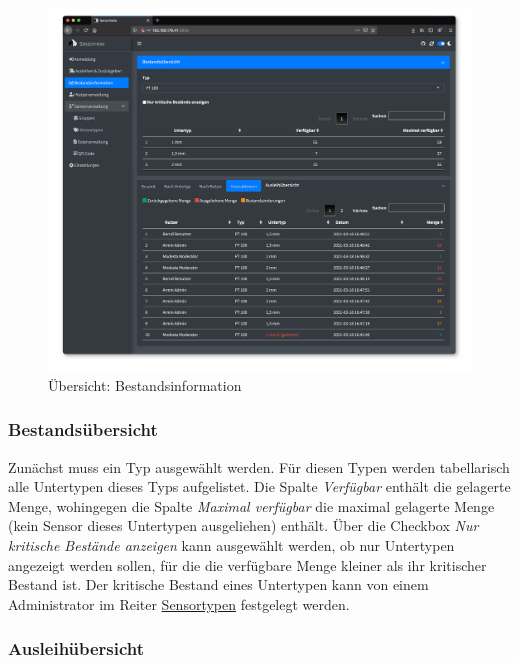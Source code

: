 \documentclass[
]{article}
\begin{document}
\begin{figure}
\centering
\includegraphics{./img/reporting_overview.png}
\caption{\label{fig:reporting-overview}Übersicht: Bestandsinformation}
\end{figure}

\hypertarget{bestandsuxfcbersicht}{%
\subsubsection{Bestandsübersicht}\label{bestandsuxfcbersicht}}

Zunächst muss ein Typ ausgewählt werden. Für diesen Typen werden tabellarisch alle Untertypen dieses Typs aufgelistet. Die Spalte \emph{Verfügbar} enthält die gelagerte Menge, wohingegen die Spalte \emph{Maximal verfügbar} die maximal gelagerte Menge (kein Sensor dieses Untertypen ausgeliehen) enthält. Über die Checkbox \emph{Nur kritische Bestände anzeigen} kann ausgewählt werden, ob nur Untertypen angezeigt werden sollen, für die die verfügbare Menge kleiner als ihr kritischer Bestand ist. Der kritische Bestand eines Untertypen kann von einem Administrator im Reiter \protect\hyperlink{type}{Sensortypen} festgelegt werden.

\hypertarget{ausleihuxfcbersicht}{%
\subsubsection{Ausleihübersicht}\label{ausleihuxfcbersicht}}
\end{document}
